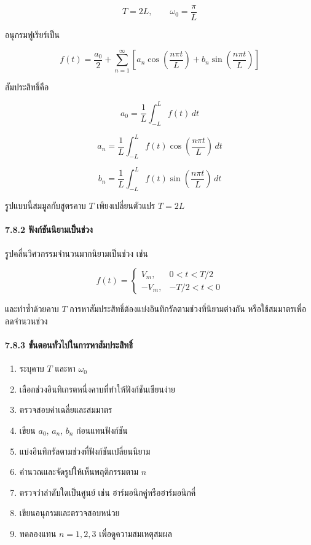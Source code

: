 \[
T=2L,\qquad \omega_0=\frac{\pi}{L}
\]

อนุกรมฟูเรียร์เป็น

\[
f(t)=\frac{a_0}{2}+\sum_{n=1}^{\infty}\left[a_n\cos\left(\frac{n\pi t}{L}\right)+b_n\sin\left(\frac{n\pi t}{L}\right)\right]
\]

สัมประสิทธิ์คือ

\[
a_0=\frac{1}{L}\int_{-L}^{L}f(t)\,dt
\]

\[
a_n=\frac{1}{L}\int_{-L}^{L}f(t)\cos\left(\frac{n\pi t}{L}\right)\,dt
\]

\[
b_n=\frac{1}{L}\int_{-L}^{L}f(t)\sin\left(\frac{n\pi t}{L}\right)\,dt
\]

รูปแบบนี้สมมูลกับสูตรคาบ \(T\) เพียงเปลี่ยนตัวแปร \(T=2L\)

\paragraph{7.8.2 ฟังก์ชันนิยามเป็นช่วง}

รูปคลื่นวิศวกรรมจำนวนมากนิยามเป็นช่วง เช่น

\[
f(t)=
\begin{cases}
V_m, & 0<t<T/2\\
-V_m, & -T/2<t<0
\end{cases}
\]

และทำซ้ำด้วยคาบ \(T\) การหาสัมประสิทธิ์ต้องแบ่งอินทิกรัลตามช่วงที่นิยามต่างกัน หรือใช้สมมาตรเพื่อลดจำนวนช่วง

\paragraph{7.8.3 ขั้นตอนทั่วไปในการหาสัมประสิทธิ์}

\begin{enumerate}
\def\labelenumi{\arabic{enumi}.}
\item
  ระบุคาบ \(T\) และหา \(\omega_0\)
\item
  เลือกช่วงอินทิเกรตหนึ่งคาบที่ทำให้ฟังก์ชันเขียนง่าย
\item
  ตรวจสอบค่าเฉลี่ยและสมมาตร
\item
  เขียน \(a_0\), \(a_n\), \(b_n\) ก่อนแทนฟังก์ชัน
\item
  แบ่งอินทิกรัลตามช่วงที่ฟังก์ชันเปลี่ยนนิยาม
\item
  คำนวณและจัดรูปให้เห็นพฤติกรรมตาม \(n\)
\item
  ตรวจว่าลำดับใดเป็นศูนย์ เช่น ฮาร์มอนิกคู่หรือฮาร์มอนิกคี่
\item
  เขียนอนุกรมและตรวจสอบหน่วย
\item
  ทดลองแทน \(n=1,2,3\) เพื่อดูความสมเหตุสมผล
\end{enumerate}

